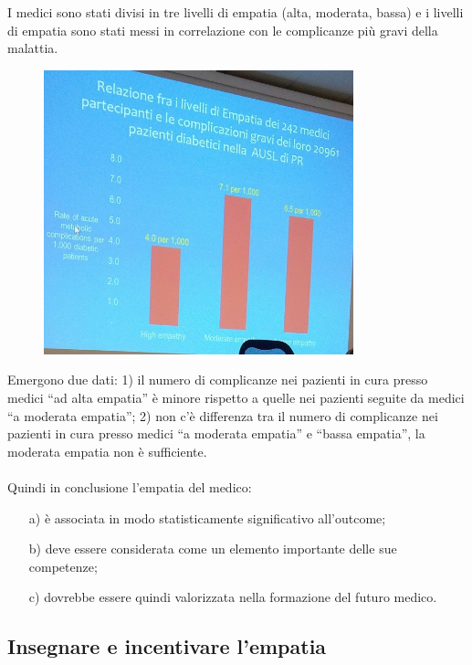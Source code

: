 I medici sono stati divisi in tre livelli di empatia (alta, moderata,
bassa) e i livelli di empatia sono stati messi in correlazione con le
complicanze più gravi della malattia.

\begin{figure}[!ht]
\centering
	\includegraphics[width=0.8\textwidth]{41/image9.jpeg}
	\end{figure}
	
Emergono due dati: 1) il numero di complicanze nei pazienti in cura
presso medici ``ad alta empatia'' è minore rispetto a quelle nei
pazienti seguite da medici ``a moderata empatia''; 2) non c'è differenza
tra il numero di complicanze nei pazienti in cura presso medici ``a
moderata empatia'' e ``bassa empatia'', la moderata empatia non è
sufficiente.
\\\\
Quindi in conclusione l'empatia del medico:
\begin{itemize}
\item[a)] è associata in modo statisticamente significativo all'outcome;
\item[b)] deve essere considerata come un elemento importante delle sue
competenze;
\item[c)] dovrebbe essere quindi valorizzata nella formazione del futuro
medico.
\end{itemize}

\subsection{Insegnare e incentivare l'empatia}

